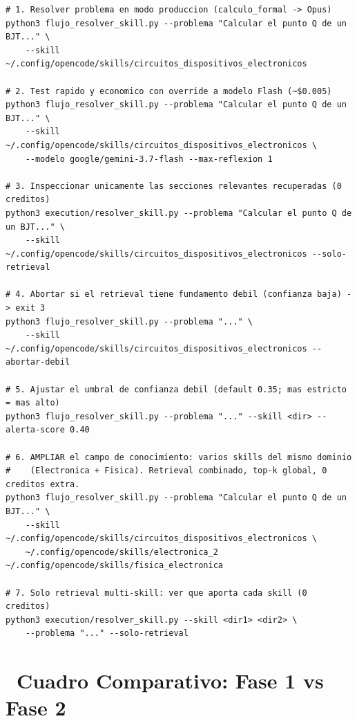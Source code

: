 \documentclass[11pt,a4paper]{article}
\newcommand{\iconotexto}[2]{\textcolor{cyanNeon}{\faIcon{#1}}~#2}
\begin{document}
\begin{tcolorbox}[cajaContenido, title={\faIcon{terminal}~Comandos para la Fase 2 (Resolución de Problemas)}]
\begin{lstlisting}[style=estiloBash]
# 1. Resolver problema en modo produccion (calculo_formal -> Opus)
python3 flujo_resolver_skill.py --problema "Calcular el punto Q de un BJT..." \
    --skill ~/.config/opencode/skills/circuitos_dispositivos_electronicos

# 2. Test rapido y economico con override a modelo Flash (~$0.005)
python3 flujo_resolver_skill.py --problema "Calcular el punto Q de un BJT..." \
    --skill ~/.config/opencode/skills/circuitos_dispositivos_electronicos \
    --modelo google/gemini-3.7-flash --max-reflexion 1

# 3. Inspeccionar unicamente las secciones relevantes recuperadas (0 creditos)
python3 execution/resolver_skill.py --problema "Calcular el punto Q de un BJT..." \
    --skill ~/.config/opencode/skills/circuitos_dispositivos_electronicos --solo-retrieval

# 4. Abortar si el retrieval tiene fundamento debil (confianza baja) -> exit 3
python3 flujo_resolver_skill.py --problema "..." \
    --skill ~/.config/opencode/skills/circuitos_dispositivos_electronicos --abortar-debil

# 5. Ajustar el umbral de confianza debil (default 0.35; mas estricto = mas alto)
python3 flujo_resolver_skill.py --problema "..." --skill <dir> --alerta-score 0.40

# 6. AMPLIAR el campo de conocimiento: varios skills del mismo dominio
#    (Electronica + Fisica). Retrieval combinado, top-k global, 0 creditos extra.
python3 flujo_resolver_skill.py --problema "Calcular el punto Q de un BJT..." \
    --skill ~/.config/opencode/skills/circuitos_dispositivos_electronicos \
    ~/.config/opencode/skills/electronica_2 ~/.config/opencode/skills/fisica_electronica

# 7. Solo retrieval multi-skill: ver que aporta cada skill (0 creditos)
python3 execution/resolver_skill.py --skill <dir1> <dir2> \
    --problema "..." --solo-retrieval
\end{lstlisting}
\end{tcolorbox}

\section[Comparativa y Síntesis Global]{\iconotexto{balance-scale}{Cuadro Comparativo: Fase 1 vs Fase 2}}
\end{document}
